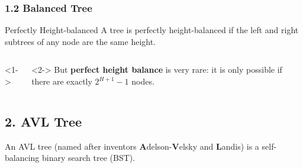 \documentclass[aspectratio=169, 14pt]{beamer}
\begin{document}
\begin{frame}[fragile]
    \frametitle{1.2 Balanced Tree}
\begin{exampleblock}{Perfectly Height-balanced}
 A tree is \alert{perfectly} height-balanced if the left and right subtrees of any node are the same height.
\end{exampleblock}

\begin{columns}
    <1->
    <2->
    But \textbf{perfect height balance} is very rare: it is only possible if there are exactly $2^{H+1} - 1$ nodes.
\end{columns}

\end{frame}


\begin{frame}

    \section{\textcolor{darkmidnightblue}{2. AVL Tree}} 
    An AVL tree (named after inventors \textbf{A}delson-\textbf{V}elsky and \textbf{L}andis) is a self-balancing binary search tree (BST).
\end{frame}
\end{document}
